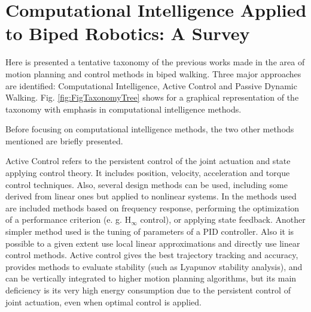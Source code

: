 \section{Computational Intelligence Applied to Biped Robotics: A
  Survey}

Here is presented a tentative taxonomy of the previous works made in
the area of motion planning and control methods in biped
walking. Three major approaches are identified: Computational
Intelligence, Active Control and Passive Dynamic
Walking. Fig. \ref{fig:FigTaxonomyTree} shows for a graphical
representation of the taxonomy with emphasis in computational
intelligence methods.


Before focusing on computational intelligence methods, the two other
methods mentioned are briefly presented.


Active Control refers to the persistent control of the joint actuation
and state applying control theory. It includes position, velocity,
acceleration and torque control techniques. Also, several design
methods can be used, including some derived from linear ones but
applied to nonlinear systems. In the methods used are included methods
based on frequency response, performing the optimization of a
performance criterion (e. g. H$_\infty$ control), or applying state
feedback. Another simpler method used is the tuning of parameters of a
PID controller. Also it is possible to a given extent use local linear
approximations and directly use linear control methods. Active control
gives the best trajectory tracking and accuracy, provides methods to
evaluate stability (such as Lyapunov stability analysis), and can be
vertically integrated to higher motion planning algorithms, but its
main deficiency is its very high energy consumption due to the
persistent control of joint actuation, even when optimal control is
applied.

